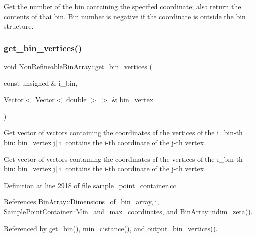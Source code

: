 Get the number of the bin containing the specified coordinate; also return the contents of that bin. Bin number is negative if the coordinate is outside the bin structure. 

\mbox{\label{classNonRefineableBinArray_a84750d2bf80a132783b3982ad1462ffc}} 
\subsubsection{\texorpdfstring{get\+\_\+bin\+\_\+vertices()}{get\_bin\_vertices()}}
{\footnotesize\ttfamily void Non\+Refineable\+Bin\+Array\+::get\+\_\+bin\+\_\+vertices (\begin{DoxyParamCaption}\item[{const unsigned \&}]{i\+\_\+bin,  }\item[{Vector$<$ Vector$<$ double $>$ $>$ \&}]{bin\+\_\+vertex }\end{DoxyParamCaption})}



Get vector of vectors containing the coordinates of the vertices of the i\+\_\+bin-\/th bin\+: bin\+\_\+vertex\mbox{[}j\mbox{]}\mbox{[}i\mbox{]} contains the i-\/th coordinate of the j-\/th vertex. 

Get vector of vectors containing the coordinates of the vertices of the i\+\_\+bin-\/th bin\+: bin\+\_\+vertex\mbox{[}j\mbox{]}\mbox{[}i\mbox{]} contains the i-\/th coordinate of the j-\/th vertex. 

Definition at line 2918 of file sample\+\_\+point\+\_\+container.\+cc.



References Bin\+Array\+::\+Dimensions\+\_\+of\+\_\+bin\+\_\+array, i, Sample\+Point\+Container\+::\+Min\+\_\+and\+\_\+max\+\_\+coordinates, and Bin\+Array\+::ndim\+\_\+zeta().



Referenced by get\+\_\+bin(), min\+\_\+distance(), and output\+\_\+bin\+\_\+vertices().

\mbox{\label{classNonRefineableBinArray_acaf7074a42df5d890372cc6d53c90694}} 
